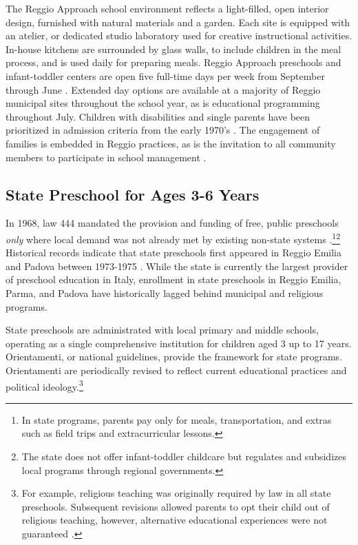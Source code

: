 The Reggio Approach school environment reflects a light-filled, open interior design, furnished with natural materials and a garden. Each site is equipped with an atelier, or dedicated studio laboratory used for creative instructional activities. In-house kitchens are surrounded by glass walls, to include children in the meal process, and is used daily for preparing meals. Reggio Approach preschools and infant-toddler centers are open five full-time days per week from September through June \citep{Giudici-Nicolosi_2014_Reggio-Approach}. Extended day options are available at a majority of Reggio municipal sites throughout the school year, as is educational programming throughout July. Children with disabilities and single parents have been prioritized in admission criteria from the early 1970's \citep{Edwards-etal-eds_1998_Hundred-Languages}. The engagement of families is embedded in Reggio practices, as is the invitation to all community members to participate in school management \citep{CEHD_2016_Historical-Analysis,Cagliari-etal-eds_2016_BOOK_Loris-Malaguzzi}. 



\subsection{State Preschool for Ages 3-6 Years}
In 1968, law 444 mandated the provision and funding of free, public preschools \textit{only} where local demand was not already met by existing non-state systems \citep{Hohnerlein_2009_Paradox-Public-Preschools}.\footnote{In state programs, parents pay only for meals, transportation, and extras such as field trips and extracurricular lessons.}\footnote{The state does not offer infant-toddler childcare but regulates and subsidizes local programs through regional governments.}  Historical records indicate that state preschools first appeared in Reggio Emilia and Padova between 1973-1975 \citep{Padova-Admin-Data_1964-2011,Reggio-Admin-data_1966-2006,Reggio-Annual-Journals_1994-2011}. While the state is currently the largest provider of preschool education in Italy, enrollment in state preschools in Reggio Emilia, Parma, and Padova have historically lagged behind municipal and religious programs.

State preschools are administrated with local primary and middle schools, operating as a single comprehensive institution for children aged 3 up to 17 years. Orientamenti, or national guidelines, provide the framework for state programs. Orientamenti are periodically revised to reflect current educational practices and political ideology.\footnote{For example, religious teaching was originally required by law in all state preschools. Subsequent revisions allowed parents to opt their child out of religious teaching, however, alternative educational experiences were not guaranteed \citep{CEHD_2016_Historical-Analysis}.} 

